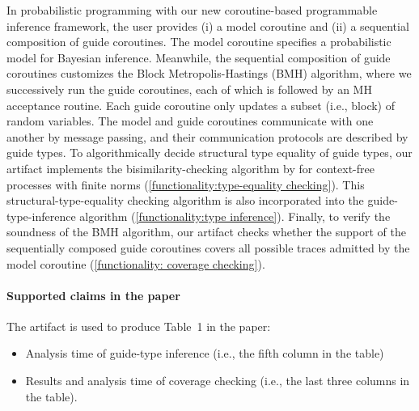 In probabilistic programming with our new coroutine-based programmable inference
framework, the user provides (i) a model coroutine and (ii) a sequential
composition of guide coroutines.
%
The model coroutine specifies a probabilistic model for Bayesian inference.
%
Meanwhile, the sequential composition of guide coroutines customizes the Block
Metropolis-Hastings (BMH) algorithm, where we successively run the guide
coroutines, each of which is followed by an MH acceptance routine.
%
Each guide coroutine only updates a subset (i.e., block) of random variables.
%
The model and guide coroutines communicate with one another by message passing,
and their communication protocols are described by guide types.
%
To algorithmically decide structural type equality of guide types, our artifact
implements the bisimilarity-checking algorithm by \citeauthor{Hirshfeld1994} for
context-free processes with finite norms (\ref{functionality:type-equality
  checking}).
%
This structural-type-equality checking algorithm is also incorporated into the
guide-type-inference algorithm (\ref{functionality:type inference}).
%
Finally, to verify the soundness of the BMH algorithm, our artifact checks
whether the support of the sequentially composed guide coroutines covers all
possible traces admitted by the model coroutine (\ref{functionality: coverage
  checking}).

\paragraph{Supported claims in the paper}

The artifact is used to produce Table~1 in the paper:
\begin{itemize}
  \item Analysis time of guide-type inference (i.e., the fifth column in the
        table)
  \item Results and analysis time of coverage checking (i.e., the last three
        columns in the table).
\end{itemize}
